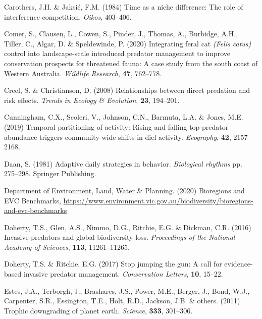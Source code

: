 \documentclass[]{elsarticle} %
\begin{document}
\leavevmode\hypertarget{ref-carothers1984time}{}%
Carothers, J.H. \& Jaksić, F.M. (1984) Time as a niche difference: The role of interference competition. \emph{Oikos}, 403--406.

\leavevmode\hypertarget{ref-comer2020integrating}{}%
Comer, S., Clausen, L., Cowen, S., Pinder, J., Thomas, A., Burbidge, A.H., Tiller, C., Algar, D. \& Speldewinde, P. (2020) Integrating feral cat \emph{(Felis catus)} control into landscape-scale introduced predator management to improve conservation prospects for threatened fauna: A case study from the south coast of Western Australia. \emph{Wildlife Research}, \textbf{47}, 762--778.

\leavevmode\hypertarget{ref-creel2008relationships}{}%
Creel, S. \& Christianson, D. (2008) Relationships between direct predation and risk effects. \emph{Trends in Ecology \& Evolution}, \textbf{23}, 194--201.

\leavevmode\hypertarget{ref-cunningham2019temporal}{}%
Cunningham, C.X., Scoleri, V., Johnson, C.N., Barmuta, L.A. \& Jones, M.E. (2019) Temporal partitioning of activity: Rising and falling top-predator abundance triggers community-wide shifts in diel activity. \emph{Ecography}, \textbf{42}, 2157--2168.

\leavevmode\hypertarget{ref-daan1981adaptive}{}%
Daan, S. (1981) Adaptive daily strategies in behavior. \emph{Biological rhythms} pp. 275--298. Springer Publishing.

\leavevmode\hypertarget{ref-delwp2020bioregions}{}%
Department of Environment, Land, Water \& Planning. (2020) Bioregions and EVC Benchmarks, \url{https://www.environment.vic.gov.au/biodiversity/bioregions-and-evc-benchmarks}

\leavevmode\hypertarget{ref-doherty2016invasive}{}%
Doherty, T.S., Glen, A.S., Nimmo, D.G., Ritchie, E.G. \& Dickman, C.R. (2016) Invasive predators and global biodiversity loss. \emph{Proceedings of the National Academy of Sciences}, \textbf{113}, 11261--11265.

\leavevmode\hypertarget{ref-doherty2017stop}{}%
Doherty, T.S. \& Ritchie, E.G. (2017) Stop jumping the gun: A call for evidence-based invasive predator management. \emph{Conservation Letters}, \textbf{10}, 15--22.

\leavevmode\hypertarget{ref-estes2011trophic}{}%
Estes, J.A., Terborgh, J., Brashares, J.S., Power, M.E., Berger, J., Bond, W.J., Carpenter, S.R., Essington, T.E., Holt, R.D., Jackson, J.B. \& others. (2011) Trophic downgrading of planet earth. \emph{Science}, \textbf{333}, 301--306.
\end{document}
